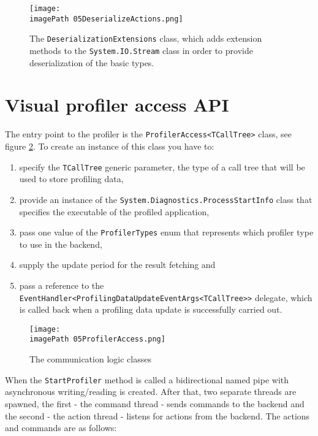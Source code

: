 \begin{figure}
	\centering
		\texttt{[image: \\imagePath 05DeserializeActions.png]}
		\caption{The \texttt{DeserializationExtensions} class, which adds extension methods to the \texttt{System.IO.Stream} class in order to provide deserialization of the basic types. }
	\label{fig:05DeserializeActions}
\end{figure}

\section{Visual profiler access API}
The entry point to the profiler is the \texttt{ProfilerAccess\textless TCallTree\textgreater} class, see figure \ref{fig:05ProfilerAccess}. To create an instance of this class you have to:
\begin{enumerate}

\item specify the \texttt{TCallTree} generic parameter, the type of a call tree that will be used to store profiling data,

\item provide an instance of the \texttt{System.Diagnostics.ProcessStartInfo} class that specifies the executable of the profiled application,

\item pass one value of the \texttt{ProfilerTypes} enum that represents which profiler type to use in the backend,

\item supply the update period for the result fetching and

\item pass a reference to the \texttt{EventHandler\textless ProfilingDataUpdateEventArgs\textless TCallTree\textgreater\textgreater} delegate, which is called back when a profiling data update is successfully carried out.
 
\end{enumerate}
\begin{figure}
	\centering
		\texttt{[image: \\imagePath 05ProfilerAccess.png]}
		\caption{The communication logic classes}
	\label{fig:05ProfilerAccess}
\end{figure}

When the \texttt{StartProfiler} method is called a bidirectional named pipe with asynchronous writing/reading is created. After that, two separate threads are spawned, the first - the command thread - sends commands to the backend and the second - the action thread - listens for actions from the backend. The actions and commands are as follows:

